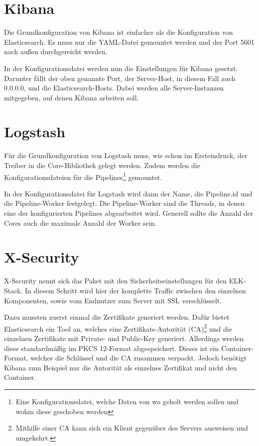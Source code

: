 \section{Kibana}

Die Grundkonfiguration von Kibana ist einfacher als die Konfiguration von Elasticsearch. Es muss nur die YAML-Datei gemountet werden und der Port 5601 nach außen durchgereicht werden.

In der Konfigurationsdatei werden nun die Einstellungen für Kibana gesetzt. Darunter fällt der oben genannte Port, der Server-Host, in diesem Fall auch 0.0.0.0, und die Elasticsearch-Hosts. Dabei werden alle Server-Instanzen mitgegeben, auf denen Kibana arbeiten soll. 

\section{Logstash}

Für die Grundkonfiguration von Logstash muss, wie schon im Ersteindruck, der Treiber in die Core-Bibliothek gelegt werden. Zudem werden die Konfigurationsdateien für die Pipelines\footnote{Eine Konfigurationsdatei, welche Daten von wo geholt werden sollen und wohin diese geschoben werden} gemountet.

In der Konfigurationsdatei für Logstash wird dann der Name, die Pipeline.id und die Pipeline-Worker festgelegt. Die Pipeline-Worker sind die Threads, in denen eine der konfigurierten Pipelines abgearbeitet wird. Generell sollte die Anzahl der Cores auch die maximale Anzahl der Worker sein.


\section{X-Security}

X-Security nennt sich das Paket mit den Sicherheitseinstellungen für den ELK-Stack. In diesem Schritt wird hier der komplette Traffic zwischen den einzelnen Komponenten, sowie vom Endnutzer zum Server mit SSL verschlüsselt. 

Dazu mussten zuerst einmal die Zertifikate generiert werden. Dafür bietet Elasticsearch ein Tool an, welches eine Zertifikats-Autorität (CA)\footnote{Mithilfe einer CA kann sich ein Klient gegenüber des Servers ausweisen und umgekehrt.} und die einzelnen Zertifikate mit Private- und Public-Key generiert. Allerdings werden diese standardmäßig im PKCS 12-Format abgespeichert. Dieses ist ein Container-Format, welches die Schlüssel und die CA zusammen verpackt. Jedoch benötigt Kibana zum Beispiel nur die Autorität als einzelnes Zertifikat und nicht den Container.

